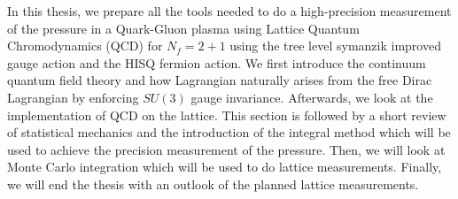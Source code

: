 In this thesis, we prepare all the tools needed to do a high-precision measurement of the pressure in a Quark-Gluon plasma using Lattice Quantum Chromodynamics (QCD) for $N_f=2+1$ using the tree level symanzik improved gauge action and the HISQ fermion action. We first introduce the continuum quantum field theory and how Lagrangian naturally arises from the free Dirac Lagrangian by enforcing $SU(3)$ gauge invariance. Afterwards, we look at the implementation of QCD on the lattice. This section is followed by a short review of statistical mechanics and the introduction of the integral method which will be used to achieve the precision measurement of the pressure. Then, we will look at Monte Carlo integration which will be used to do lattice measurements. Finally, we will end the thesis with an outlook of the planned lattice measurements.   